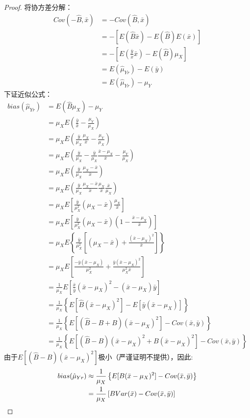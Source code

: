 \begin{proof}
	将协方差分解：
	\begin{align*}
		Cov(-\hat{B},\bar{x})&=-Cov(\hat{B},\bar{x}) \\
		&=-\left[E(\hat{B}\bar{x})-E(\hat{B})E(\bar{x})\right] \\
		&=-\left[E\left(\frac{\bar{y}}{\bar{x}}\bar{x}\right)-E(\hat{B})\mu_X\right] \\
		&=E(\hat{\mu}_{Yr})-E(\bar{y}) \\
		&=E(\hat{\mu}_{Yr})-\mu_Y
	\end{align*}
	下证近似公式：
	\begin{align*}
		bias(\hat{\mu}_{Yr})
		&=E(\hat{B}\mu_X)-\mu_Y \\
		&=\mu_XE\left(\frac{\bar{y}}{\bar{x}}-\frac{\mu_Y}{\mu_X}\right) \\
		&=\mu_XE\left(\frac{\bar{y}}{\mu_X}\frac{\mu_X}{\bar{x}}-\frac{\mu_Y}{\mu_X}\right) \\
		&=\mu_XE\left(\frac{\bar{y}}{\mu_X}-\frac{\bar{y}}{\mu_X}\frac{\bar{x}-\mu_X}{\bar{x}}-\frac{\mu_Y}{\mu_X}\right) \\
		&=\mu_XE\left(\frac{\bar{y}}{\mu_X}\frac{\mu_X-\bar{x}}{\bar{x}}\right) \\
		&=\mu_XE\left(\frac{\bar{y}}{\mu_X}\frac{\mu_X-\bar{x}}{\bar{x}}\frac{\mu_X}{\bar{x}}\frac{\bar{x}}{\mu_X}\right) \\
		&=\mu_XE\left[\frac{\bar{y}}{\mu_X^2}(\mu_X-\bar{x})\frac{\mu_X}{\bar{x}}\right] \\
		&=\mu_XE\left[\frac{\bar{y}}{\mu_X^2}(\mu_X-\bar{x})\left(1-\frac{\bar{x}-\mu_X}{\bar{x}}\right)\right] \\
		&=\mu_XE\left\{\frac{\bar{y}}{\mu_X^2}\left[(\mu_X-\bar{x})+\frac{(\bar{x}-\mu_X)^2}{\bar{x}}\right]\right\} \\
		&=\mu_XE\left[\frac{-\bar{y}(\bar{x}-\mu_X)}{\mu_X^2}+\frac{\bar{y}(\bar{x}-\mu_X)^2}{\mu_X^2\bar{x}}\right] \\
		&=\frac{1}{\mu_X}E\left[\frac{\bar{x}}{\bar{y}}(\bar{x}-\mu_X)^2-(\bar{x}-\mu_X)\bar{y}\right] \\
		&=\frac{1}{\mu_X}\left\{E[\hat{B}(\bar{x}-\mu_X)^2]-E[\bar{y}(\bar{x}-\mu_X)]\right\} \\
		&=\frac{1}{\mu_X}\left\{E[(\hat{B}-B+B)(\bar{x}-\mu_X)^2]-Cov(\bar{x},\bar{y})\right\} \\
		&=\frac{1}{\mu_X}\left\{E[(\hat{B}-B)(\bar{x}-\mu_X)^2+B(\bar{x}-\mu_X)^2]-Cov(\bar{x},\bar{y})\right\}
	\end{align*}
	由于$E\left[(\hat{B}-B)(\bar{x}-\mu_X)^2\right]$极小（严谨证明不提供），因此:
	\begin{align*}
		bias(\hat{\mu}_{Yr})&\approx\frac{1}{\mu_X}\left\{E[B(\bar{x}-\mu_X)^2]-Cov(\bar{x},\bar{y})\right\} \\
		&=\frac{1}{\mu_X}\left[BVar(\bar{x})-Cov(\bar{x},\bar{y})\right] \qedhere
	\end{align*}
\end{proof}
